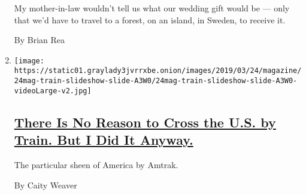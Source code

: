 \begin{enumerate}
  My mother-in-law wouldn't tell us what our wedding gift would be ---
  only that we'd have to travel to a forest, on an island, in Sweden, to
  receive it.

  By Brian Rea
\item
  \texttt{[image: https://static01.graylady3jvrrxbe.onion/images/2019/03/24/magazine/24mag-train-slideshow-slide-A3W0/24mag-train-slideshow-slide-A3W0-videoLarge-v2.jpg]}

  \hypertarget{there-is-no-reason-to-cross-the-us-by-train-but-i-did-it-anyway}{%
  \subsection{\texorpdfstring{\href{/interactive/2019/03/20/magazine/train-across-america-amtrak.html}{There
  Is No Reason to Cross the U.S. by Train. But I Did It
  Anyway.}}{There Is No Reason to Cross the U.S. by Train. But I Did It Anyway.}}\label{there-is-no-reason-to-cross-the-us-by-train-but-i-did-it-anyway}}

  The particular sheen of America by Amtrak.

  By Caity Weaver
\end{enumerate}

